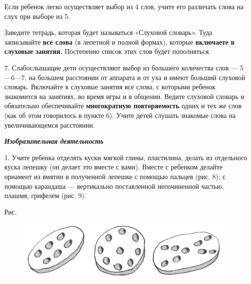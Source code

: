 \documentclass[a5paper]{book}
\renewcommand{\emph}[1]{\textit{#1}}
\begin{document}
Если ребенок легко осуществляет выбор из 4 слов, учите его различать
слова на слух при выборе из 5.

Заведите тетрадь, которая будет называться «Слуховой словарь». Туда
записывайте \textbf{все слова} (в лепетной и полной формах), которые
\textbf{включаете в слуховые занятия.} Постепенно список этих слов будет
пополняться.

7. Слабослышащие дети осуществляют выбор из большего количества слов ---
5---6---7, на большем расстоянии от аппарата и от уха и имеют больший
слуховой словарь. Включайте в слуховые занятия все слова, с которыми
ребенок знакомится на занятиях, во время игры и в общении. Ведите
слуховой словарь и обязательно обеспечивайте \textbf{многократную
повторяемость} одних и тех же слов (как об этом говорилось в пункте 6).
Учите детей слушать знакомые слова на увеличивающемся расстоянии.

\emph{\textbf{Изобразительная деятельность}}

1. Учите ребенка отделять куски мягкой глины, пластилина, делать из
отдельного куска лепешку (он делает это вместе с вами). Вместе с
ребенком делайте орнамент из вмятин в полученной лепешке с помощью
пальцев (рис. 8); с помощью карандаша --- вертикально поставленной
непочиненной частью, плашмя, грифелем (рис. 9).

Рис.
\begin{figure}
\includegraphics[width=4.27986in,height=1.22014in]{media/media/image8.jpg}
\end{figure}
\end{document}
